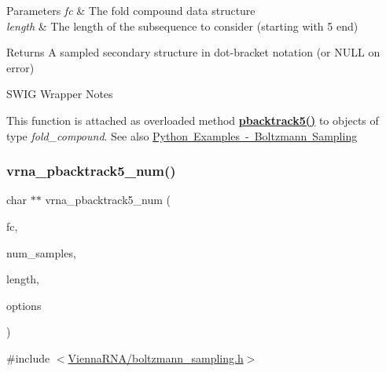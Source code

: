 \begin{DoxyParams}{Parameters}
{\em fc} & The fold compound data structure \\
\hline
{\em length} & The length of the subsequence to consider (starting with 5\textquotesingle{} end) \\
\hline
\end{DoxyParams}
\begin{DoxyReturn}{Returns}
A sampled secondary structure in dot-\/bracket notation (or N\+U\+LL on error)
\end{DoxyReturn}
\begin{DoxyRefDesc}{S\+W\+I\+G Wrapper Notes}
\item[\mbox{\hyperlink{wrappers__wrappers000005}{S\+W\+I\+G Wrapper Notes}}]This function is attached as overloaded method {\bfseries{\mbox{\hyperlink{group__subopt__stochbt__deprecated_gaf2e614b8beb4ddf3e8751433b76f39db}{pbacktrack5()}}}} to objects of type {\itshape fold\+\_\+compound}. See also \mbox{\hyperlink{examples_python_examples_python_pbacktrack}{Python Examples -\/ Boltzmann Sampling}} \end{DoxyRefDesc}
\mbox{\label{group__subopt__stochbt_ga30c3ddff868c44eecfdb07d99a2422ba}} 
\subsubsection{\texorpdfstring{vrna\_pbacktrack5\_num()}{vrna\_pbacktrack5\_num()}}
{\footnotesize\ttfamily char $\ast$$\ast$ vrna\+\_\+pbacktrack5\+\_\+num (\begin{DoxyParamCaption}\item[{\mbox{\hyperlink{group__fold__compound_ga1b0cef17fd40466cef5968eaeeff6166}{vrna\+\_\+fold\+\_\+compound\+\_\+t}} $\ast$}]{fc,  }\item[{unsigned int}]{num\+\_\+samples,  }\item[{unsigned int}]{length,  }\item[{unsigned int}]{options }\end{DoxyParamCaption})}



{\ttfamily \#include $<$\mbox{\hyperlink{boltzmann__sampling_8h}{Vienna\+R\+N\+A/boltzmann\+\_\+sampling.\+h}}$>$}



